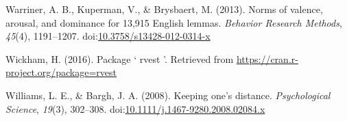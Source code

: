 \documentclass[english,,man]{apa6}
\begin{document}
\leavevmode\hypertarget{ref-Warriner2013}{}%
Warriner, A. B., Kuperman, V., \& Brysbaert, M. (2013). Norms of valence, arousal, and dominance for 13,915 English lemmas. \emph{Behavior Research Methods}, \emph{45}(4), 1191--1207. doi:\href{https://doi.org/10.3758/s13428-012-0314-x}{10.3758/s13428-012-0314-x}

\leavevmode\hypertarget{ref-Wickham2016}{}%
Wickham, H. (2016). Package ` rvest '. Retrieved from \url{https://cran.r-project.org/package=rvest}

\leavevmode\hypertarget{ref-Williams2008}{}%
Williams, L. E., \& Bargh, J. A. (2008). Keeping one's distance. \emph{Psychological Science}, \emph{19}(3), 302--308. doi:\href{https://doi.org/10.1111/j.1467-9280.2008.02084.x}{10.1111/j.1467-9280.2008.02084.x}

\endgroup
\end{document}
